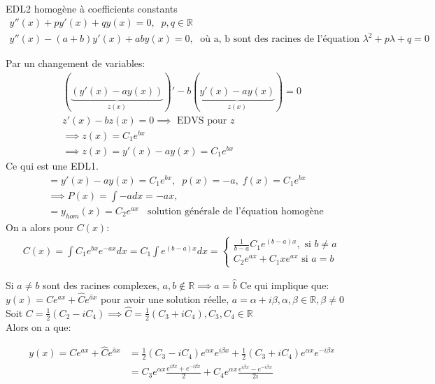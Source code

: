     \begin{parag}{EDL2 homogène à coefficients constants}
        \begin{align*}
            y''(x) + py'(x) + qy(x) = 0, \; \; p, q \in  \mathbb{R} \\
            y''(x) - (a + b)y'(x) + aby(x) = 0, \; \text{ où a, b sont des racines de l'équation } \lambda^2 + p \lambda + q = 0
        \end{align*}
        
        Par un changement de variables:
        \begin{align*}
            ( \underbrace{(y'(x) - ay(x))}_{z(x)})' - b( \underbrace{y'(x) - ay(x)}_{z(x)}) = 0 \\
            z'(x) - bz(x) = 0 \implies \text{ EDVS pour } z \\
            \implies z(x) = C_1 e^{bx} \\
            \implies z(x) = y'(x) - ay(x) = C_1 e^{bx}
        \end{align*}
        Ce qui est une EDL1.
        \begin{align*}
            &=y'(x) - ay(x) = C_1e^{bx}, \; \;  p(x) = -a, \; f(x) = C_1 e^{bx} \\
            &\implies P(x) = \int -adx = -ax, \\
           &=y_{hom}(x) = C_2e^{ax} \; \; \text{ solution générale de l'équation homogène}
        \end{align*}
        On a alors pour $C(x)$:
        \begin{align*}
            C(x) = \int C_1e^{bx} e^{-ax} dx = C_1 \int e^{(b-a)x}dx = \begin{cases} \frac{1}{b-a}C_1 e^{(b-a)x}, \text{ si } b \neq a \\ C_2 e^{ax} + C_1 xe^{ax} \text{ si } a = b \end{cases}
        \end{align*}

    
        Si $a \neq b$ sont des racines complexes, $a, b \notin \mathbb{R} \implies a = \hat{b}$
        Ce qui implique que: $y(x) = Ce^{ax} + \hat{C} e^{\hat{a}x}$ pour avoir une solution réelle, $a = \alpha + i \beta , \alpha, \beta \in \mathbb{R}, \beta \neq 0$
        \\        Soit $C = \frac{1}{2}(C_2 - iC_4) \implies \hat{C} = \frac{1}{2} (C_3 + iC_4), C_3, C_4 \in \mathbb{R} $ \\
        Alors on a que:

        \begin{align*}
                  y(x) = Ce^{ax} + \hat{C}e^{\hat{a}x} &= \frac{1}{2}(C_3 -  iC_4)e^{ \alpha x}e^{i \beta x} + \frac{1}{2}(C_3 + iC_4)e^{ \alpha x} e^{-i \beta x}\\
                                                       &= C_3 e^{ \alpha x} \frac{e^{i \beta x } + e^{-i \beta x}}{2} + C_4 e^{ \alpha x} \frac{e^{i \beta x} - e^{- i \beta x}}{2i}
          \end{align*} 
    
    \end{parag}
    
